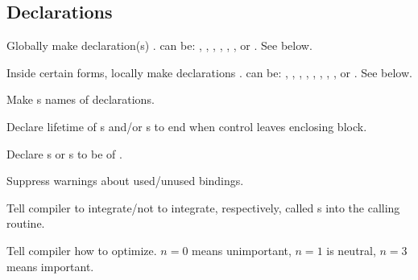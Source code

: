 \subsection{Declarations}
\begin{LIST}{1cm}

  {
  Globally make declaration(s) .  can be:
  ,      
  ,
  ,           
  ,   
  ,
  , or
  .
  See below.
  }

  {
  Inside certain forms, locally make declarations .  can be:
  ,
  ,
  ,           
  ,       
  ,     
  ,     
  ,  
  , or
  .
  See below.      
  }

  \begin{LIST}{.5cm}
    
    {
    Make s names of declarations.
   }
 
    {
    Declare lifetime of s and/or s to end
    when control leaves enclosing block.
  }


    {
    Declare s or s to be of .
  }

    {
    Suppress warnings about used/unused bindings.
  }

    {
    Tell compiler to integrate/not to integrate, respectively, called
    s into the calling routine.
  }

    {
    Tell compiler how to optimize. $n=0$ means unimportant, $n=1$ is
    neutral, $n=3$ means important.
  }


\end{LIST}
\end{LIST}
